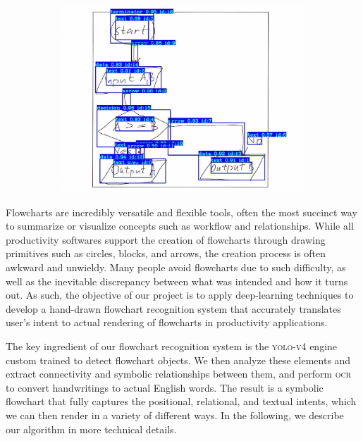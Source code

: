 \documentclass[10pt]{article}
\begin{document}
\begin{figure}[h]
\begin{subfigure}{0.32\columnwidth}
\end{subfigure}
\begin{subfigure}{0.32\columnwidth}
\includegraphics[width=\columnwidth]{fc_03.jpeg}
\end{subfigure}
\end{figure}

Flowcharts are incredibly versatile and flexible tools, often the most
succinct way to summarize or visualize concepts such as workflow and
relationships.
While all productivity softwares support the creation of flowcharts through
drawing primitives such as circles, blocks, and arrows, the creation
process is often awkward and unwieldy.  Many people avoid flowcharts due to such
difficulty, as well as the inevitable discrepancy between what was intended and how it
turns out. As such, 
the objective of our project is to apply deep-learning techniques to develop a
hand-drawn flowchart recognition system
that accurately translates user's intent to actual rendering of flowcharts in
productivity applications.

The key ingredient of our flowchart recognition system is the
\textsc{yolo-v4} engine custom trained to detect flowchart objects.
We then analyze these elements and extract connectivity and
symbolic relationships between them, and perform \textsc{ocr} to convert
handwritings to actual English words. The result is a symbolic flowchart that fully
captures the positional, relational, and textual intents, which we can then render
in a variety of different ways.
In the following, we describe our algorithm in more technical details.
\end{document}
